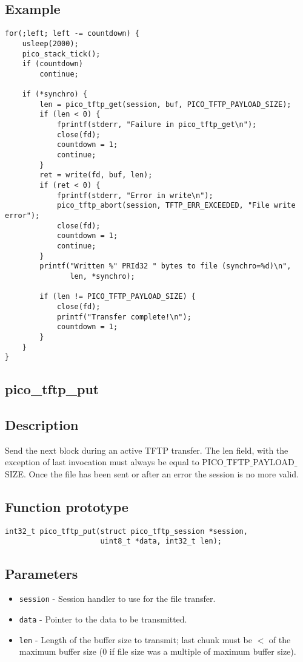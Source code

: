 \subsection*{Example}
\begin{verbatim}
for(;left; left -= countdown) {
    usleep(2000);
    pico_stack_tick();
    if (countdown)
        continue;

    if (*synchro) {
        len = pico_tftp_get(session, buf, PICO_TFTP_PAYLOAD_SIZE);
        if (len < 0) {
            fprintf(stderr, "Failure in pico_tftp_get\n");
            close(fd);
            countdown = 1;
            continue;
        }
        ret = write(fd, buf, len);
        if (ret < 0) {
            fprintf(stderr, "Error in write\n");
            pico_tftp_abort(session, TFTP_ERR_EXCEEDED, "File write error");
            close(fd);
            countdown = 1;
            continue;
        }
        printf("Written %" PRId32 " bytes to file (synchro=%d)\n",
               len, *synchro);

        if (len != PICO_TFTP_PAYLOAD_SIZE) {
            close(fd);
            printf("Transfer complete!\n");
            countdown = 1;
        }
    }
}
\end{verbatim}


\subsection{pico\_tftp\_put}

\subsection*{Description}
Send the next block during an active TFTP transfer. The len field, with the exception of last invocation must always be equal to PICO$\_$TFTP$\_$PAYLOAD$\_$SIZE. Once the file has been sent or after an error the session is no more valid.

\subsection*{Function prototype}
\begin{verbatim}
int32_t pico_tftp_put(struct pico_tftp_session *session,
                      uint8_t *data, int32_t len);
\end{verbatim}

\subsection*{Parameters}
\begin{itemize}[noitemsep]
\item \texttt{session} - Session handler to use for the file transfer.
\item \texttt{data} - Pointer to the data to be transmitted.
\item \texttt{len} - Length of the buffer size to transmit; last chunk must be $<$ of the maximum buffer size (0 if file size was a multiple of maximum buffer size).

\end{itemize}

